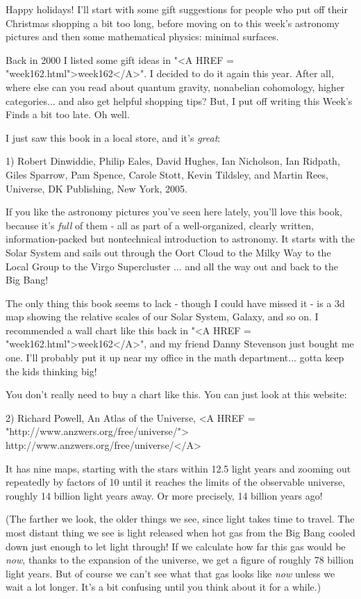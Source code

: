 


Happy holidays!  I'll start with some gift suggestions for people
who put off their Christmas shopping a bit too long, before moving 
on to this week's astronomy pictures and then some mathematical 
physics: minimal surfaces.

Back in 2000 I listed some gift ideas in 
"<A HREF = "week162.html">week162</A>".  I decided to do 
it again this year.  After all, where else can you read about quantum 
gravity, nonabelian cohomology, higher categories... and also get 
helpful shopping tips?  But, I put off writing this Week's Finds a
bit too late.  Oh well.

I just saw this book in a local store, and it's \emph{great}:

1) Robert Dinwiddie, Philip Eales, David Hughes, Ian Nicholson, Ian Ridpath, 
Giles Sparrow, Pam Spence, Carole Stott, Kevin Tildsley, and Martin Rees, 
Universe, DK Publishing, New York, 2005.

If you like the astronomy pictures you've seen here lately, you'll love
this book, because it's \emph{full} 
of them - all as part of a well-organized, 
clearly written, information-packed but nontechnical introduction to 
astronomy.  It starts with the Solar System and sails out through the 
Oort Cloud to the Milky Way to the Local Group to the Virgo Supercluster
... and all the way out and back to the Big Bang!

The only thing this book seems to lack - though I could have missed it -
is a 3d map showing the relative scales of our Solar System, Galaxy, and 
so on.  I recommended a wall chart like this 
back in "<A HREF = "week162.html">week162</A>", and my 
friend Danny Stevenson just bought me one.  I'll probably put it up 
near my office in the math department... gotta keep the kids thinking big!

You don't really need to buy a chart like this.  You can just look at 
this website:

2) Richard Powell, An Atlas of the Universe, 
<A HREF = "http://www.anzwers.org/free/universe/">
http://www.anzwers.org/free/universe/</A>

It has nine maps, starting with the stars within 12.5 light years and
zooming out repeatedly by factors of 10 until it reaches the limits of 
the observable universe, roughly 14 billion light years away.  Or more 
precisely, 14 billion years ago!  

(The farther we look, the older things we see, since light takes time to
travel.  The most distant thing we see is light released when hot gas 
from the Big Bang cooled down just enough to let light through!  If we 
calculate how far this gas would be \emph{now}, 
thanks to the expansion of the 
universe, we get a figure of roughly 78 billion light years.  But of course 
we can't see what that gas looks like \emph{now} 
unless we wait a lot longer.  
It's a bit confusing until you think about it for a while.)

